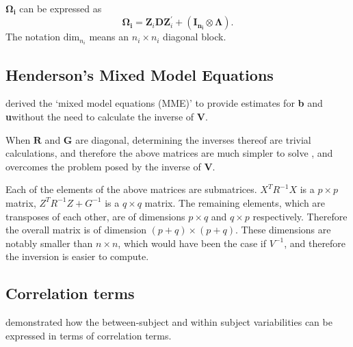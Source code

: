\documentclass[12pt, a4paper]{report}
\theoremstyle{plain}
\theoremstyle{definition}
\theoremstyle{remark}
\begin{document}
$\boldsymbol{\Omega_{i}}$ can be expressed as
\[
\boldsymbol{\Omega_{i}} = \boldsymbol{Z}_{i}\boldsymbol{D}\boldsymbol{Z}_{i}^\prime + ({\boldsymbol{I_{n_{i}}} \otimes \boldsymbol{\Lambda}}).
\]
The notation $\mbox{dim}_{n_{i}}$ means an $n_{i} \times n_{i}$ diagonal block.

\subsection{Henderson's Mixed Model Equations}
\citet{Henderson50, Henderson63, Henderson73,
	Henderson84a} derived the `mixed model equations (MME)' to provide
estimates for \textbf{b} and \textbf{u}without the need to
calculate the inverse of \textbf{V}.


When $\textbf{R}$ and $\textbf{G}$  are diagonal, determining the
inverses thereof are trivial calculations, and therefore the above
matrices are much simpler to solve , and overcomes the problem
posed by the inverse of \textbf{V}.

Each of the elements of the above matrices are submatrices.
$X^{T}R^{-1}X$ is a $p \times p$ matrix, $Z^{T}R^{-1}Z + G^{-1}$
is a $q \times q$ matrix. The remaining elements, which are
transposes of each other, are of dimensions $p \times q$ and $q
\times p$ respectively. Therefore the overall matrix is of
dimension $(p+q) \times (p+q)$. These dimensions are notably
smaller than $n \times n$, which would have been the case if
$V^{-1}$, and therefore the inversion is easier to compute.

\newpage
\subsection{Correlation terms}
\citet{hamlett} demonstrated how the between-subject and within subject variabilities can be expressed in terms of
correlation terms.
\end{document}
